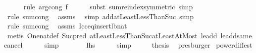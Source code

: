\begin{isabellebody}
\ \ \ \ \isamarkupfalse%
\ {\isacharparenleft}{\kern0pt}rule\ arg{\isacharunderscore}{\kern0pt}cong{}{\isacharbrackleft}{\kern0pt}\ f{\isacharequal}{\kern0pt}{\isachardoublequoteopen}{\isacharparenleft}{\kern0pt}{\isacharminus}{\kern0pt}{\isacharparenright}{\kern0pt}{\isachardoublequoteclose}{\isacharbrackright}{\kern0pt}{\isacharparenright}{\kern0pt}\isanewline
\ \ \ \ \isamarkupfalse%
\ {\isacharparenleft}{\kern0pt}subst\ sum{\isachardot}{\kern0pt}reindex{\isacharbrackleft}{\kern0pt}symmetric{\isacharbrackright}{\kern0pt}{\isacharcomma}{\kern0pt}\ simp{\isacharparenright}{\kern0pt}\isanewline
\ \ \ \ \ \isamarkupfalse%
\ {\isacharparenleft}{\kern0pt}rule\ sum{\isachardot}{\kern0pt}cong{\isacharparenright}{\kern0pt}\ \isamarkupfalse%
\ assms\ \isamarkupfalse%
\ {\isacharparenleft}{\kern0pt}simp\ add{\isacharcolon}{\kern0pt}atLeastLessThanSuc{\isacharcomma}{\kern0pt}\ simp{\isacharparenright}{\kern0pt}\isanewline
\ \ \ \ \isamarkupfalse%
\ {\isacharparenleft}{\kern0pt}rule\ sum{\isachardot}{\kern0pt}cong{\isacharparenright}{\kern0pt}\ \isamarkupfalse%
\ assms\ Icc{\isacharunderscore}{\kern0pt}eq{\isacharunderscore}{\kern0pt}insert{\isacharunderscore}{\kern0pt}lb{\isacharunderscore}{\kern0pt}nat\ \isanewline
\ \ \ \ \ \isamarkupfalse%
\ {\isacharparenleft}{\kern0pt}metis\ One{\isacharunderscore}{\kern0pt}nat{\isacharunderscore}{\kern0pt}def\ Suc{\isacharunderscore}{\kern0pt}pred\ atLeastLessThanSuc{\isacharunderscore}{\kern0pt}atLeastAtMost\ le{\isacharunderscore}{\kern0pt}add{}\ le{\isacharunderscore}{\kern0pt}add{\isacharunderscore}{\kern0pt}same{\isacharunderscore}{\kern0pt}cancel{}{\isacharparenright}{\kern0pt}\isanewline
\ \ \ \ \isamarkupfalse%
\ simp\isanewline
\ \ \isamarkupfalse%
\ \isamarkupfalse%
\ {\isachardoublequoteopen}{\isachardot}{\kern0pt}{\isachardot}{\kern0pt}{\isachardot}{\kern0pt}\ {\isacharequal}{\kern0pt}\ {\isacharquery}{\kern0pt}lhs{\isachardoublequoteclose}\isanewline
\ \ \ \ \isamarkupfalse%
\ simp\isanewline
\ \ \isamarkupfalse%
\ \isamarkupfalse%
\ {\isacharquery}{\kern0pt}thesis\ \isamarkupfalse%
\ presburger\isanewline
{}\isamarkupfalse%
%
\endisatagproof
{\isafoldproof}%
%
\isadelimproof
\isanewline
%
\endisadelimproof
\isanewline
{}\isamarkupfalse%
\ power{\isacharunderscore}{\kern0pt}diff{\isacharunderscore}{\kern0pt}est{\isacharcolon}{\kern0pt}\isanewline

\end{isabellebody}
